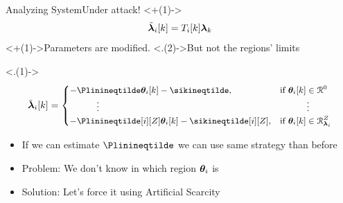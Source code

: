 \documentclass[aspectratio=169]{beamer}
\begin{document}
\begin{frame}{Analyzing System}{Under attack!}
  \centering
  \vspace{-1cm}
  \onslide<+(1)->{
    \begin{equation*}
      \tilde{\boldsymbol{\lambda}}_{i}[k]=T_{i}[k]\boldsymbol{\lambda}_{k}
    \end{equation*}
  }
  \onslide<+(1)->{Parameters are modified.} \onslide<.(2)->{But not the regions' limits}

  \onslide<.(1)->{
  \begin{equation*}
    \small
      \lambdaicheat[k]=
      \begin{cases}
        -\Plinineqtilde      \thetaik-\sikineqtilde      ,&\text{if }\thetaik\in\set{R}^{0}\tikzmark{a}\\
        \qquad\quad \vdots&\qquad\quad \vdots\\
        -\Plinineqtilde[i][Z]\thetaik-\sikineqtilde[i][Z],&\text{if}\ \thetaik \in\set{R}_{\lambdai}^{Z}\\
      \end{cases}
  \end{equation*}
  }

  \begin{itemize}[<+(2)->]
    \item If we can estimate $\Plinineqtilde$ we can use same strategy than before
    \item Problem: We don't know in which region $\boldsymbol{\theta}_{i}$ is
    \item Solution: Let's force it using Artificial Scarcity
  \end{itemize}
\end{frame}
\end{document}
